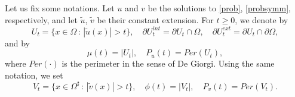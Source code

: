 \documentclass[12pt]{article}
\newcommand{\abs}[1]{{\left|#1\right|}}
\theoremstyle{definition}
\theoremstyle{plain}
\theoremstyle{definition}
\begin{document}
Let us fix some notations. Let $u$ and $v$ be the solutions to \eqref{prob}, \eqref{probsymm}, respectively, and let $\tilde u$, $\tilde v$ be their constant extension. For $t\geq0$, we denote by
\begin{equation*}
    U_t=\{x\in\Omega\,:\,|\tilde u(x)|>t\},\quad \partial U_t^{int}=\partial U_t\cap \Omega,\quad \partial U_t^{ext}=\partial U_t\cap \partial \Omega,
\end{equation*}
and by
\begin{equation}\label{distribuzioemu}
    \mu(t)=\abs{U_t},\quad P_u(t)=Per(U_t),
\end{equation}
where $Per(\cdot)$ is the perimeter in the sense of De Giorgi. Using the same notation, we set
\begin{equation}\label{distribuzionephi}
    V_t=\{x\in\Omega^\sharp\,:\,|\tilde v(x)|>t\},\quad
    \phi(t)=\abs{V_t},\quad P_v(t)=Per(V_t).
\end{equation}
\end{document}
